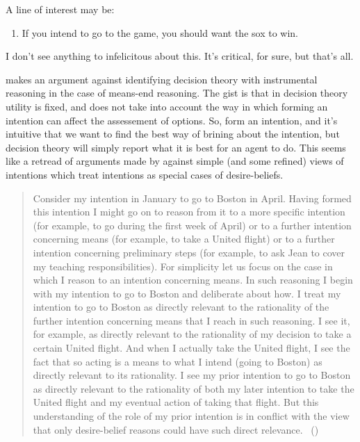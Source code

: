 \documentclass[10pt]{article}
\begin{document}
A line of interest may be:
\begin{enumerate}
\item If you intend to go to the game, you should want the sox to win.
\end{enumerate}
I don't see anything to infelicitous about this.
It's critical, for sure, but that's all.


\newpage


\textcite{Broome:2002aa} makes an argument against identifying decision theory with instrumental reasoning in the case of means-end reasoning.
The gist is that in decision theory utility is fixed, and does not take into account the way in which forming an intention can affect the assessement of options.
So, form an intention, and it's intuitive that we want to find the best way of brining about the intention, but decision theory will simply report what it is best for an agent to do.
This seems like a retread of arguments made by \textcite{Bratman:1987aa} against simple (and some refined) views of intentions which treat intentions as special cases of desire-beliefs.

\begin{quote}
  Consider my intention in January to go to Boston in April.
  Having formed this intention I might go on to reason from it to a more specific intention (for example, to go during the first week of April) or to a further intention concerning means (for example, to take a United flight) or to a further intention concerning preliminary steps (for example, to ask Jean to cover my teaching responsibilities).
  For simplicity let us focus on the case in which I reason to an intention concerning means.
  In such reasoning I begin with my intention to go to Boston and deliberate about how.
  I treat my intention to go to Boston as directly relevant to the rationality of the further intention concerning means that I reach in such reasoning.
  I see it, for example, as directly relevant to the rationality of my decision to take a certain United flight.
  And when I actually take the United flight, I see the fact that so acting is a means to what I intend (going to Boston) as directly relevant to its rationality.
  I see my prior
  intention to go to Boston as directly relevant to the rationality of both my later intention to take the United flight and my eventual action of taking that flight.
  But this understanding of the role of my prior intention is in conflict with the view that only desire-belief reasons could have such direct relevance.\nolinebreak
  \mbox{ }\hfill(\citeyear[22]{Bratman:1987aa})
\end{quote}
\end{document}
